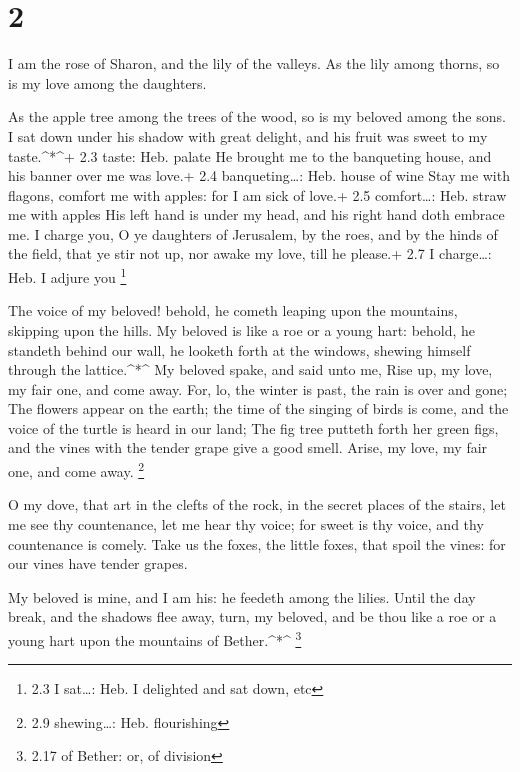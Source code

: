 \hypertarget{section-1}{%
\section{2}\label{section-1}}

 I am the rose of Sharon, and the lily of the valleys.
 As the lily among thorns, so is my love among the
daughters.

 As the apple tree among the trees of the wood, so is my
beloved among the sons. I sat down under his shadow with great delight,
and his fruit was sweet to my taste.\^{}*\^{}+ 2.3 taste: Heb. palate
 He brought me to the banqueting house, and his banner over
me was love.+ 2.4 banqueting\ldots: Heb. house of wine  Stay
me with flagons, comfort me with apples: for I am sick of love.+ 2.5
comfort\ldots: Heb. straw me with apples  His left hand is
under my head, and his right hand doth embrace me.  I charge
you, O ye daughters of Jerusalem, by the roes, and by the hinds of the
field, that ye stir not up, nor awake my love, till he please.+ 2.7 I
charge\ldots: Heb. I adjure you \footnote{2.3 I sat\ldots: Heb. I
  delighted and sat down, etc}

 The voice of my beloved! behold, he cometh leaping upon the
mountains, skipping upon the hills.  My beloved is like a
roe or a young hart: behold, he standeth behind our wall, he looketh
forth at the windows, shewing himself through the lattice.\^{}*\^{}
 My beloved spake, and said unto me, Rise up, my love, my
fair one, and come away.  For, lo, the winter is past, the
rain is over and gone;  The flowers appear on the earth;
the time of the singing of birds is come, and the voice of the turtle is
heard in our land;  The fig tree putteth forth her green
figs, and the vines with the tender grape give a good smell. Arise, my
love, my fair one, and come away. \footnote{2.9 shewing\ldots: Heb.
  flourishing}

 O my dove, that art in the clefts of the rock, in the
secret places of the stairs, let me see thy countenance, let me hear thy
voice; for sweet is thy voice, and thy countenance is comely.
 Take us the foxes, the little foxes, that spoil the vines:
for our vines have tender grapes.

 My beloved is mine, and I am his: he feedeth among the
lilies.  Until the day break, and the shadows flee away,
turn, my beloved, and be thou like a roe or a young hart upon the
mountains of Bether.\^{}*\^{} \footnote{2.17 of Bether: or, of division}

